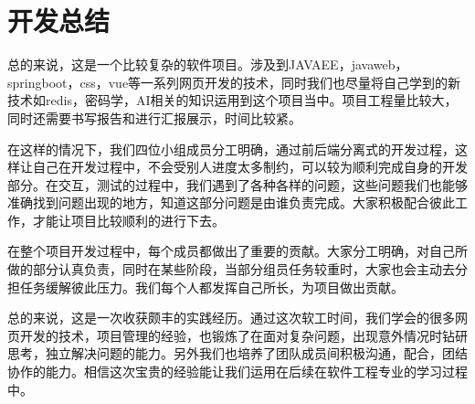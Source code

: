 \section{开发总结}
总的来说，这是一个比较复杂的软件项目。涉及到JAVAEE，javaweb，springboot，css，vue等一系列网页开发的技术，同时我们也尽量将自己学到的新技术如redis，密码学，AI相关的知识运用到这个项目当中。项目工程量比较大，同时还需要书写报告和进行汇报展示，时间比较紧。

在这样的情况下，我们四位小组成员分工明确，通过前后端分离式的开发过程，这样让自己在开发过程中，不会受别人进度太多制约，可以较为顺利完成自身的开发部分。在交互，测试的过程中，我们遇到了各种各样的问题，这些问题我们也能够准确找到问题出现的地方，知道这部分问题是由谁负责完成。大家积极配合彼此工作，才能让项目比较顺利的进行下去。

在整个项目开发过程中，每个成员都做出了重要的贡献。大家分工明确，对自己所做的部分认真负责，同时在某些阶段，当部分组员任务较重时，大家也会主动去分担任务缓解彼此压力。我们每个人都发挥自己所长，为项目做出贡献。

总的来说，这是一次收获颇丰的实践经历。通过这次软工时间，我们学会的很多网页开发的技术，项目管理的经验，也锻炼了在面对复杂问题，出现意外情况时钻研思考，独立解决问题的能力。另外我们也培养了团队成员间积极沟通，配合，团结协作的能力。相信这次宝贵的经验能让我们运用在后续在软件工程专业的学习过程中。

